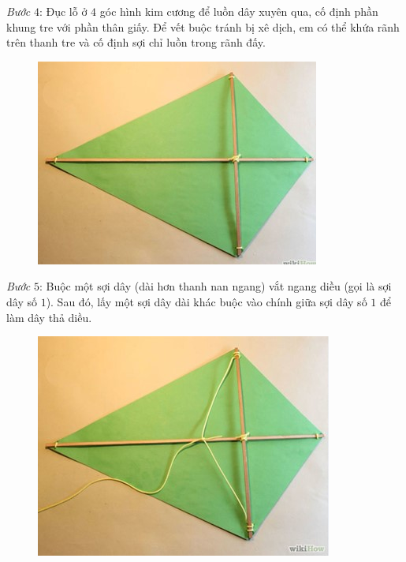 \begin{multicols}{2}
\begin{figure}[H]
		\vspace*{-10pt}
	\end{figure}
	\textit{Bước} $4$: Đục lỗ ở $4$ góc hình kim cương để luồn dây xuyên qua, cố định phần khung tre với phần thân giấy. Để vết buộc tránh bị xê dịch, em có thể khứa rãnh trên thanh tre và cố định sợi chỉ luồn trong rãnh đấy.
	\begin{figure}[H]
		\vspace*{-5pt}
		\centering
		\captionsetup{labelformat= empty, justification=centering}
		\includegraphics[width= 1\linewidth]{5}
		\vspace*{-10pt}
	\end{figure}
	\textit{Bước} $5$: Buộc một sợi dây (dài hơn thanh nan ngang) vắt ngang diều (gọi là sợi dây số $1$). Sau đó, lấy một sợi dây dài khác buộc vào chính giữa sợi dây số $1$ để làm dây thả diều.
	\begin{figure}[H]
		\vspace*{-5pt}
		\centering
		\captionsetup{labelformat= empty, justification=centering}
		\includegraphics[width= 1\linewidth]{6}

\end{figure}
\end{multicols}
